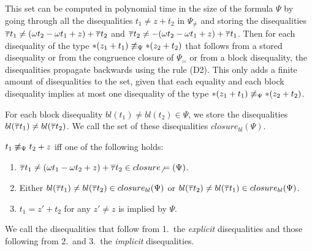 This set can be computed in polynomial time in the size of the formula $\Psi$ by going through all the
disequalities $t_1 \neq z + t_2$ in $\Psi_\neq$ and storing the disequalities
$\overline{\tau} t_1  \neq (\omega t_2 - \omega t_1 + z) + \overline{\tau} t_2$ and $\overline{\tau} t_2 \neq - (\omega t_2 - \omega t_1 + z) + \overline{\tau} t_1$.
Then for each disequality of the type $*(z_1 + t_1) \not\equiv_\Psi *(z_2 + t_2)$ that follows from a stored disequality or from the congruence closure of $\Psi_=$ or from a block disequality,
the disequalities propagate backwards using the rule (D2).
This only adds a finite amount of disequalities to the set, given that each equality and each block disequality implies at most one disequality of the type $*(z_1 + t_1) \not\equiv_\Psi *(z_2 + t_2)$.

For each block disequality $bl(t_1) \neq bl(t_2) \in \Psi$, we store the disequalities $bl(\overline{\tau} t_1) \neq bl(\overline{\tau} t_2)$.
We call the set of these disequalities $closure_{bl}(\Psi)$.

\begin{lemma}\label{lemma:diseq_types}
  $t_1 \not\equiv_\Psi t_2 + z$ iff one of the following holds:

  \begin{enumerate}
    \item $\overline{\tau} t_1 \neq (\omega t_1 - \omega t_2 + z) + \overline{\tau} t_2 \in closure_\neq(\Psi)$.
    \item Either $bl(\overline{\tau} t_1) \neq bl(\overline{\tau} t_2) \in closure_{bl}(\Psi)$ or $bl(\overline{\tau} t_2) \neq bl(\overline{\tau} t_1) \in closure_{bl}(\Psi)$.
    \item $t_1 = z' + t_2$ for any $z' \neq z$ is implied by $\Psi$.
  \end{enumerate}
  We call the disequalities that follow from 1.\ the \emph{explicit} disequalities and those following from 2.\ and 3.\ the \emph{implicit} disequalities.
\end{lemma}
